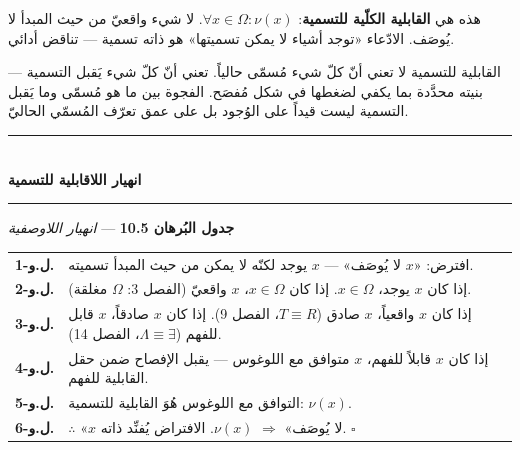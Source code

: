 \documentclass[10pt, openany, oneside]{book}
\renewcommand{\normalsize}{\fontsize{10}{13}\selectfont}
\renewcommand{\footnotesize}{\fontsize{8.5}{11}\selectfont}
\begin{document}
\vspace{0.8em}

\noindent هذه هي \textbf{القابلية الكلّية للتسمية}: $\forall x \in \Omega: \nu(x)$. لا شيء واقعيّ من حيث المبدأ لا يُوصَف. الادّعاء «توجد أشياء لا يمكن تسميتها» هو ذاته تسمية --- تناقض أدائي.

القابلية للتسمية لا تعني أنّ كلّ شيء مُسمّى حالياً. تعني أنّ كلّ شيء يَقبل التسمية --- بنيته محدَّدة بما يكفي لضغطها في شكل مُفصَح. الفجوة بين ما هو مُسمّى وما يَقبل التسمية ليست قيداً على الوُجود بل على عمق تعرّف المُسمّي الحاليّ.

\vspace{1.5em}


\begin{center}
    \rule{0.3\textwidth}{0.4pt}\\[0.5em]
    {\normalsize\bfseries انهيار اللاقابلية للتسمية}\\[0.3em]
    \rule{0.3\textwidth}{0.4pt}
\end{center}

\vspace{1em}

\textbf{جدول البُرهان 10.5} --- \textit{انهيار اللاوصفية}

\vspace{0.5em}

{\footnotesize
\noindent\begin{tabular}{r p{}}
\textbf{ل.و-1.} & افترض: «$x$ لا يُوصَف» --- $x$ يوجد لكنّه لا يمكن من حيث المبدأ تسميته. \\[0.3em]
\textbf{ل.و-2.} & إذا كان $x$ يوجد، $x \in \Omega$. إذا كان $x \in \Omega$، $x$ واقعيّ (الفصل 3: $\Omega$ مغلقة). \\[0.3em]
\textbf{ل.و-3.} & إذا كان $x$ واقعياً، $x$ صادق ($T \equiv R$، الفصل 9). إذا كان $x$ صادقاً، $x$ قابل للفهم ($\Lambda \equiv \exists$، الفصل 14). \\[0.3em]
\textbf{ل.و-4.} & إذا كان $x$ قابلاً للفهم، $x$ متوافق مع اللوغوس --- يقبل الإفصاح ضمن حقل القابلية للفهم. \\[0.3em]
\textbf{ل.و-5.} & التوافق مع اللوغوس هُوَ القابلية للتسمية: $\nu(x)$. \\[0.3em]
\textbf{ل.و-6.} & $\therefore$ «$x$ لا يُوصَف» $\Rightarrow$ $\nu(x)$. الافتراض يُفنِّد ذاته. $\square$ \\[0.3em]
\end{tabular}
}
\end{document}
